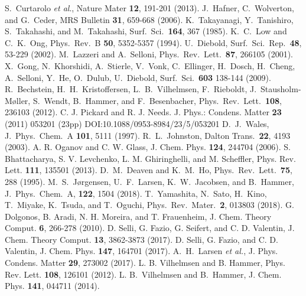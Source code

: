 \documentclass[aip,amsmath,amssymb,reprint]{revtex4-1}
\begin{document}
\begin{thebibliography}{12}  
 S.\ Curtarolo \textit{et al}., Nature Mater \textbf{12}, 191-201 (2013).
 J.\ Hafner, C.\ Wolverton, and G.\ Ceder, MRS Bulletin \textbf{31}, 659-668 (2006).
K.\ Takayanagi, Y.\ Tanishiro, S.\ Takahashi, and M.\ Takahashi, Surf.\ Sci.\ \textbf{164}, 367 (1985).
K.\ C.\ Low and C.\ K.\ Ong, Phys.\ Rev.\ B \textbf{50}, 5352-5357 (1994).
U.\ Diebold, Surf.\ Sci.\ Rep.\ \textbf{48}, 53-229 (2002).
M.\ Lazzeri and A.\ Selloni, Phys.\ Rev.\ Lett.\ \textbf{87}, 266105 (2001).
X.\ Gong, N.\ Khorshidi, A.\ Stierle, V.\ Vonk, C.\ Ellinger, H.\ Dosch, H.\ Cheng, A.\ Selloni, Y.\ He, O.\ Dulub, U.\ Diebold, Surf.\ Sci.\ \textbf{603} 138-144 (2009).
R.\ Bechstein, H.\ H.\ Kristoffersen, L.\ B.\ Vilhelmsen, F.\ Rieboldt, J.\ Stausholm-M{\o}ller, S.\ Wendt, B.\ Hammer, and F.\ Besenbacher, Phys.\ Rev.\ Lett.\ \textbf{108}, 236103 (2012).
  C. J. Pickard and R. J. Needs. J. Phys.: Condens. Matter \textbf{23} (2011) 053201 (23pp) DOI:10.1088/0953-8984/23/5/053201
D.\ J.\ Wales, J.\ Phys.\ Chem.\ A \textbf{101}, 5111 (1997).
R.\ L.\ Johnston, Dalton Trans.\ \textbf{22}, 4193 (2003).
A. R. Oganov and C. W. Glass, J. Chem. Phys. \textbf{124}, 244704 (2006).
S. Bhattacharya, S. V. Levchenko, L. M. Ghiringhelli, and M. Scheffler, Phys. Rev. Lett. \textbf{111}, 135501 (2013).
D.\ M.\ Deaven and K.\ M.\ Ho, Phys.\ Rev.\ Lett.\ \textbf{75}, 288 (1995).
M.\ S.\ J{\o}rgensen, U.\ F.\ Larsen, K.\ W.\ Jacobsen, and B.\ Hammer, J.\ Phys.\ Chem.\ A, \textbf{122}, 1504 (2018).
T.\ Yamashita, N.\ Sato, H.\ Kino, T.\ Miyake, K.\ Tsuda, and T.\ Oguchi, Phys.\ Rev.\ Mater.\ \textbf{2}, 013803 (2018).
G. Dolgonos, B. Aradi, N. H. Moreira, and T. Frauenheim, J. Chem. Theory Comput. \textbf{6}, 266-278 (2010).
D. Selli, G. Fazio, G. Seifert, and C. D. Valentin, J. Chem. Theory Comput. \textbf{13}, 3862-3873 (2017).
D. Selli, G. Fazio, and C. D. Valentin, J. Chem. Phys. \textbf{147}, 164701 (2017).
A.\ H.\ Larsen \textit{et al.}, J. Phys. Condens. Matter \textbf{29}, 273002 (2017).
L. B. Vilhelmsen and B. Hammer, Phys. Rev. Lett. \textbf{108}, 126101 (2012).
L. B.\ Vilhelmsen and B.\ Hammer, J. Chem. Phys. \textbf{141}, 044711 (2014).

\end{thebibliography}
\end{document}
